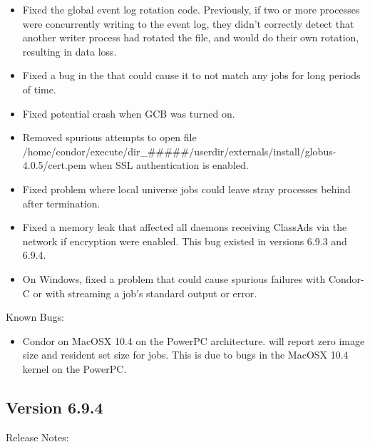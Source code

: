 \begin{itemize}
\item Fixed the global event log rotation code.  Previously, if two or
  more processes were concurrently writing to the event log, they
  didn't correctly detect that another writer process had rotated the
  file, and would do their own rotation, resulting in data loss.

\item Fixed a bug in the  that could cause it to not match
any jobs for long periods of time.

\item Fixed potential crash when GCB was turned on.

\item Removed spurious attempts to open file
/home/condor/execute/dir\_\#\#\#\#\#/userdir/externals/install/globus-4.0.5/cert.pem
when SSL authentication is enabled.

\item Fixed problem where local universe jobs could leave stray processes behind
after termination.

\item Fixed a memory leak that affected all daemons receiving ClassAds via the
network if encryption were enabled. This bug existed in versions 6.9.3 and 6.9.4.

\item On Windows, fixed a problem that could cause spurious failures with Condor-C
or with streaming a job's standard output or error.
 
\end{itemize}

\noindent Known Bugs:

\begin{itemize}

\item Condor on MacOSX 10.4 on the PowerPC architecture.
will report zero image size and resident set size for jobs. This
is due to bugs in the MacOSX 10.4 kernel on the PowerPC.

\end{itemize}


\subsection*{\label{sec:New-6-9-4}Version 6.9.4}

\noindent Release Notes:

